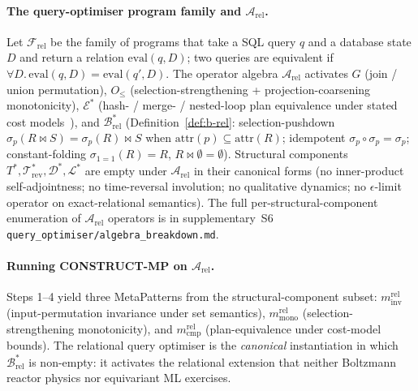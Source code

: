 \documentclass[acmsmall,screen,review]{acmart}
\begin{document}
\paragraph{The query-optimiser program family and $\mathcal{A}_{\mathrm{rel}}$.}
Let $\mathcal{F}_{\mathrm{rel}}$ be the family of programs that take a SQL query $q$ and a database state $D$ and return a relation $\mathrm{eval}(q, D)$; two queries are equivalent if $\forall D.\,\mathrm{eval}(q, D) = \mathrm{eval}(q', D)$. The operator algebra $\mathcal{A}_{\mathrm{rel}}$ activates $G$ (join / union permutation), $O_{\le}$ (selection-strengthening + projection-coarsening monotonicity), $\mathcal{E}^{*}$ (hash- / merge- / nested-loop plan equivalence under stated cost models~\cite{Wang2024QED, Markl2022LearnedQO}), and $\mathcal{B}^{*}_{\mathrm{rel}}$ (Definition~\ref{def:b-rel}: selection-pushdown $\sigma_p(R \bowtie S) = \sigma_p(R) \bowtie S$ when $\mathrm{attr}(p) \subseteq \mathrm{attr}(R)$; idempotent $\sigma_p \circ \sigma_p = \sigma_p$; constant-folding $\sigma_{1=1}(R) = R$, $R \bowtie \emptyset = \emptyset$). Structural components $T^{*}, \mathcal{T}^{*}_{\mathrm{rev}}, \mathcal{D}^{*}, \mathcal{L}^{*}$ are empty under $\mathcal{A}_{\mathrm{rel}}$ in their canonical forms (no inner-product self-adjointness; no time-reversal involution; no qualitative dynamics; no $\epsilon$-limit operator on exact-relational semantics). The full per-structural-component enumeration of $\mathcal{A}_{\mathrm{rel}}$ operators is in supplementary~S6 \texttt{query\_optimiser/algebra\_breakdown.md}.

\paragraph{Running CONSTRUCT-MP on $\mathcal{A}_{\mathrm{rel}}$.}
Steps 1--4 yield three MetaPatterns from the structural-component subset: $m^{\mathrm{rel}}_{\mathrm{inv}}$ (input-permutation invariance under set semantics), $m^{\mathrm{rel}}_{\mathrm{mono}}$ (selection-strengthening monotonicity), and $m^{\mathrm{rel}}_{\mathrm{cmp}}$ (plan-equivalence under cost-model bounds). The relational query optimiser is the \emph{canonical} instantiation in which $\mathcal{B}^{*}_{\mathrm{rel}}$ is non-empty: it activates the relational extension that neither Boltzmann reactor physics nor equivariant ML exercises.
\end{document}
